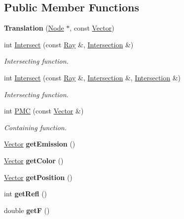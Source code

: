 \subsection*{\-Public \-Member \-Functions}
\begin{DoxyCompactItemize}
\item 
\hypertarget{class_translation_a1ecd9177ce516202fe010b47ef007265}{
{\bfseries \-Translation} (\hyperlink{class_node}{\-Node} $\ast$, const \hyperlink{class_vector}{\-Vector})}
\label{class_translation_a1ecd9177ce516202fe010b47ef007265}

\item 
int \hyperlink{class_translation_a4bd8b42e23e632d986b9b781d73676fa}{\-Intersect} (const \hyperlink{class_ray}{\-Ray} \&, \hyperlink{class_intersection}{\-Intersection} \&)
\begin{DoxyCompactList}\small\item\em \-Intersecting function. \end{DoxyCompactList}\item 
int \hyperlink{class_translation_aedd95cffebc575c47464090c4ac24c6f}{\-Intersect} (const \hyperlink{class_ray}{\-Ray} \&, \hyperlink{class_intersection}{\-Intersection} \&, \hyperlink{class_intersection}{\-Intersection} \&)
\begin{DoxyCompactList}\small\item\em \-Intersecting function. \end{DoxyCompactList}\item 
int \hyperlink{class_translation_a23217f05d1442f4f5fc7db511dd57434}{\-P\-M\-C} (const \hyperlink{class_vector}{\-Vector} \&)
\begin{DoxyCompactList}\small\item\em \-Containing function. \end{DoxyCompactList}\item 
\hypertarget{class_translation_af54c9803dfefa1ec04c13a40daedb823}{
\hyperlink{class_vector}{\-Vector} {\bfseries get\-Emission} ()}
\label{class_translation_af54c9803dfefa1ec04c13a40daedb823}

\item 
\hypertarget{class_translation_abdb54c49d261e8770d1d12119542fc1b}{
\hyperlink{class_vector}{\-Vector} {\bfseries get\-Color} ()}
\label{class_translation_abdb54c49d261e8770d1d12119542fc1b}

\item 
\hypertarget{class_translation_a27c4202120108256e3f5cbc940d619b1}{
\hyperlink{class_vector}{\-Vector} {\bfseries get\-Position} ()}
\label{class_translation_a27c4202120108256e3f5cbc940d619b1}

\item 
\hypertarget{class_translation_ae2dce5d15431d1a602dc763ebe615495}{
int {\bfseries get\-Refl} ()}
\label{class_translation_ae2dce5d15431d1a602dc763ebe615495}

\item 
\hypertarget{class_translation_aeefc7fa602cd2eb815f1a9c06f1d4d0c}{
double {\bfseries get\-F} ()}
\label{class_translation_aeefc7fa602cd2eb815f1a9c06f1d4d0c}

\end{DoxyCompactItemize}


